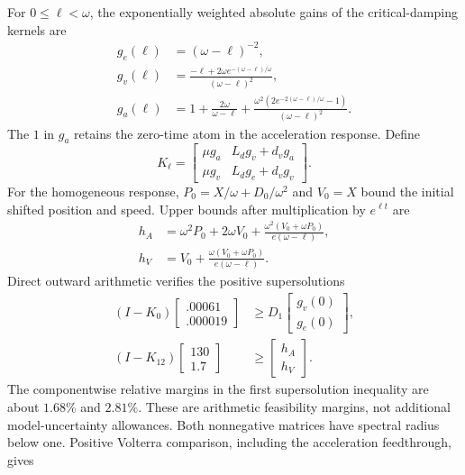 For $0\le\ell<\omega$, the exponentially weighted absolute gains of the critical-damping kernels are
\begin{align}
 g_e(\ell)&=(\omega-\ell)^{-2},\nonumber\\
 g_v(\ell)&=\frac{-\ell+2\omega e^{-(\omega-\ell)/\omega}}{(\omega-\ell)^2},\nonumber\\
 g_a(\ell)&=1+\frac{2\omega}{\omega-\ell}
 +\frac{\omega^2(2e^{-2(\omega-\ell)/\omega}-1)}{(\omega-\ell)^2}.
\end{align}
The $1$ in $g_a$ retains the zero-time atom in the acceleration response. Define
\begin{equation}
 K_\ell=\begin{bmatrix}
 \mu g_a&L_dg_v+d_vg_a\\
 \mu g_v&L_dg_e+d_vg_v
 \end{bmatrix}.
\end{equation}
For the homogeneous response, $P_0=X/\omega+D_0/\omega^2$ and $V_0=X$ bound the initial shifted position and speed. Upper bounds after multiplication by $e^{\ell t}$ are
\begin{align}
 h_A&=\omega^2P_0+2\omega V_0+\frac{\omega^2(V_0+\omega P_0)}{e(\omega-\ell)},\nonumber\\
 h_V&=V_0+\frac{\omega(V_0+\omega P_0)}{e(\omega-\ell)}.
\end{align}
Direct outward arithmetic verifies the positive supersolutions
\begin{align}
 (I-K_0)\begin{bmatrix}.00061\\.000019\end{bmatrix}
 &\ge D_1\begin{bmatrix}g_v(0)\\g_e(0)\end{bmatrix},\nonumber\\
 (I-K_{12})\begin{bmatrix}130\\1.7\end{bmatrix}
 &\ge\begin{bmatrix}h_A\\h_V\end{bmatrix}.
\end{align}
The componentwise relative margins in the first supersolution inequality are about $1.68\%$ and $2.81\%$. These are arithmetic feasibility margins, not additional model-uncertainty allowances. Both nonnegative matrices have spectral radius below one. Positive Volterra comparison, including the acceleration feedthrough, gives
